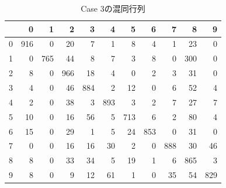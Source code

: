 \documentclass[class=jsarticle, crop=false, dvipdfmx, fleqn]{standalone}
\begin{document}
\clearpage
\begin{table}
    \centering
    \caption{Case 3の混同行列}
    \begin{tabular}{|r|rrrrrrrrrr|} \hline
        & 0 & 1 & 2 & 3 & 4 & 5 & 6 & 7 & 8 & 9 \\ \hline
        0 & 916 & 0 & 20 & 7 & 1 & 8 & 4 & 1 & 23 & 0 \\
        1 & 0 & 765 & 44 & 8 & 7 & 3 & 8 & 0 & 300 & 0 \\
        2 & 8 & 0 & 966 & 18 & 4 & 0 & 2 & 3 & 31 & 0 \\
        3 & 4 & 0 & 46 & 884 & 2 & 12 & 0 & 6 & 52 & 4 \\
        4 & 2 & 0 & 38 & 3 & 893 & 3 & 2 & 7 & 27 & 7 \\
        5 & 10 & 0 & 16 & 56 & 5 & 713 & 6 & 2 & 80 & 4 \\
        6 & 15 & 0 & 29 & 1 & 5 & 24 & 853 & 0 & 31 & 0 \\
        7 & 0 & 0 & 16 & 16 & 30 & 2 & 0 & 888 & 30 & 46 \\
        8 & 8 & 0 & 33 & 34 & 5 & 19 & 1 & 6 & 865 & 3 \\
        9 & 8 & 0 & 9 & 12 & 61 & 1 & 0 & 35 & 54 & 829 \\
        \hline
    \end{tabular}
    \label{tab:confusion_matrix_case3}
\end{table}
\vspace*{3\baselineskip}
\end{document}
